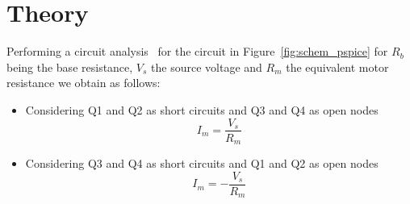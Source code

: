 \section{\textbf{Theory}}\label{sec:2}
    Performing a circuit analysis~\cite{IRWIN} for the circuit in Figure~\ref{fig:schem_pspice} for $R_{b}$ being the base resistance, $V_{s}$ the source voltage and $R_{m}$ the equivalent motor resistance we obtain as follows:
\begin{itemize}
    
\item Considering Q1 and Q2 as short circuits and Q3 and Q4 as open nodes
\begin{equation}
I_{m} = \frac{V_{s}}{R_{m}}
\end{equation}
\item Considering Q3 and Q4 as short circuits and Q1 and Q2 as open nodes
\begin{equation}
I_{m} = -\frac{V_{s}}{R_{m}}
\end{equation}
\end{itemize}
